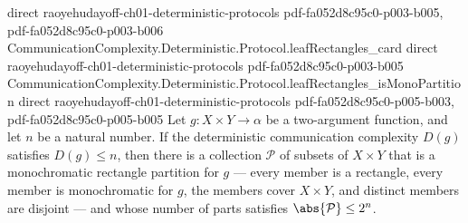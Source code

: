 \begin{theorem}
  {direct}
  {raoyehudayoff-ch01-deterministic-protocols}
  {pdf-fa052d8c95c0-p003-b005,
    pdf-fa052d8c95c0-p003-b006}
\proofstep
  {CommunicationComplexity.Deterministic.Protocol.leafRectangles_card}
  {direct}
  {raoyehudayoff-ch01-deterministic-protocols}
  {pdf-fa052d8c95c0-p003-b005}
\proofstep
  {CommunicationComplexity.Deterministic.Protocol.leafRectangles_isMonoPartition}
  {direct}
  {raoyehudayoff-ch01-deterministic-protocols}
  {pdf-fa052d8c95c0-p005-b003,
    pdf-fa052d8c95c0-p005-b005}
Let $g : X \times Y \to \alpha$ be a two-argument function, and let $n$ be a natural
number. If the deterministic communication complexity $D(g)$ satisfies $D(g) \le n$,
then there is a collection $\mathcal{P}$ of subsets of $X \times Y$ that is a
monochromatic rectangle partition for $g$ — every member is a rectangle, every member is
monochromatic for $g$, the members cover $X \times Y$, and distinct members are disjoint
— and whose number of parts satisfies $\abs{\mathcal{P}} \le 2^n$.
\end{theorem}

